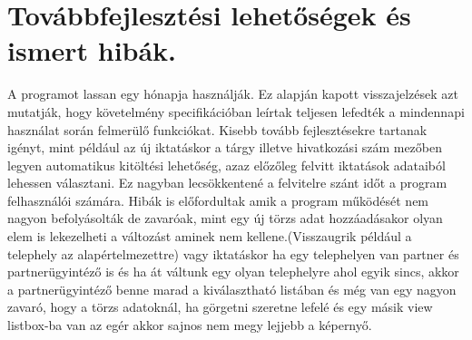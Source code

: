 \documentclass[
]{thesis-ekf}
\theoremstyle{definition}
\theoremstyle{remark}
\begin{document}
\chapter{Továbbfejlesztési lehetőségek és ismert hibák.}
A programot lassan egy hónapja használják. Ez alapján kapott visszajelzések azt mutatják, hogy követelmény specifikációban leírtak teljesen lefedték a mindennapi használat során felmerülő funkciókat. Kisebb tovább fejlesztésekre tartanak igényt, mint például az új iktatáskor a tárgy illetve hivatkozási szám mezőben legyen automatikus kitöltési lehetőség, azaz előzőleg felvitt iktatások adataiból lehessen választani. Ez nagyban lecsökkentené a felvitelre szánt időt a program felhasználói számára. Hibák is előfordultak amik a program működését nem nagyon befolyásolták de zavaróak, mint egy új törzs adat hozzáadásakor olyan elem is lekezelheti a változást aminek nem kellene.(Visszaugrik például a telephely az alapértelmezettre) vagy iktatáskor ha egy telephelyen van partner és partnerügyintéző is és ha át váltunk egy olyan telephelyre ahol egyik sincs, akkor a partnerügyintéző benne marad a kiválasztható listában és még van egy nagyon zavaró, hogy a  törzs adatoknál, ha görgetni szeretne lefelé és egy másik view listbox-ba van az egér akkor sajnos nem megy lejjebb a képernyő.
\end{document}
